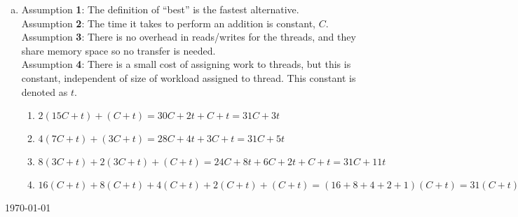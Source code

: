 \documentclass[fontsize=11pt, paper=a4, titlepage]{article}
\begin{document}
\begin{enumerate}[a)]
    \item Assumption \textbf{1}: The definition of ``best'' is the fastest
alternative. \\
    Assumption \textbf{2}: The time it takes to perform an addition is
constant, $C$. \\
    Assumption \textbf{3}: There is no overhead in reads/writes for the threads,
and they share memory space so no transfer is needed. \\
    Assumption \textbf{4}: There is a small cost of assigning work to threads,
but this  is constant, independent of size of workload assigned to thread. This
constant is denoted as $t$.
    \begin{enumerate}[A]
        \item $2(15C+t) + (C+t) = 30C+2t+C+t = 31C + 3t$
        \item $4(7C+t) + (3C+t) = 28C+4t+3C+t = 31C + 5t$
        \item $8(3C+t) + 2(3C+t) + (C+t) = 24C+8t+6C+2t+C+t = 31C + 11t $
        \item $16(C+t) + 8(C+t) + 4(C+t) + 2(C+t) + (C+t) = (16+8+4+2+1)(C+t) =
        31(C+t)$
    \end{enumerate}

\end{enumerate}

\vfill
\hfill \large{\today}
\end{document}
